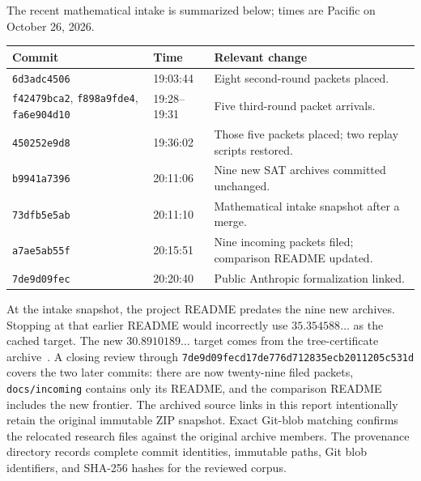 The recent mathematical intake is summarized below; times are Pacific on
October 26, 2026.
\begin{center}\small
\begin{tabular}{p{3.1cm}p{1.7cm}p{9.1cm}}
\toprule Commit & Time & Relevant change\\\midrule
\texttt{6d3adc4506}&19:03:44&Eight second-round packets placed.\\
\texttt{f42479bca2}, \texttt{f898a9fde4}, \texttt{fa6e904d10}
 &19:28--19:31&Five third-round packet arrivals.\\
\texttt{450252e9d8}&19:36:02&Those five packets placed; two replay scripts restored.\\
\texttt{b9941a7396}&20:11:06&Nine new SAT archives committed unchanged.\\
\texttt{73dfb5e5ab}&20:11:10&Mathematical intake snapshot after a merge.\\
\texttt{a7ae5ab55f}&20:15:51&Nine incoming packets filed; comparison README updated.\\
\texttt{7de9d09fec}&20:20:40&Public Anthropic formalization linked.\\
\bottomrule
\end{tabular}
\end{center}
At the intake snapshot, the project README predates the nine new archives.
Stopping at that earlier README would incorrectly use $35.354588\ldots$
as the cached target. The new $30.8910189\ldots$ target comes from the
tree-certificate archive~\cite{tree}. A closing review through
\texttt{7de9d09fecd17de776d712835ecb2011205c531d} covers the two later
commits: there are now twenty-nine filed packets, \texttt{docs/incoming}
contains only its README, and the comparison README includes the new
frontier. The archived source links in this report intentionally retain
the original immutable ZIP snapshot. Exact Git-blob matching confirms the
relocated research files against the original archive members.
The provenance directory records complete commit identities, immutable paths,
Git blob identifiers, and SHA-256 hashes for the reviewed corpus.

